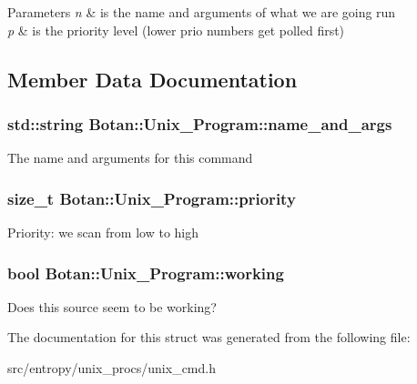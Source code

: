 \begin{DoxyParams}{Parameters}
{\em n} & is the name and arguments of what we are going run \\
\hline
{\em p} & is the priority level (lower prio numbers get polled first) \\
\hline
\end{DoxyParams}


\subsection{Member Data Documentation}
\hypertarget{structBotan_1_1Unix__Program_acc1dab9a97f04638521b35b57b32245c}{
\subsubsection[{name\-\_\-and\-\_\-args}]{\setlength{\rightskip}{0pt plus 5cm}std\-::string Botan\-::\-Unix\-\_\-\-Program\-::name\-\_\-and\-\_\-args}}\label{structBotan_1_1Unix__Program_acc1dab9a97f04638521b35b57b32245c}
The name and arguments for this command \hypertarget{structBotan_1_1Unix__Program_adcc0fcf2eea7ac2c93bc279cd584030e}{
\subsubsection[{priority}]{\setlength{\rightskip}{0pt plus 5cm}size\-\_\-t Botan\-::\-Unix\-\_\-\-Program\-::priority}}\label{structBotan_1_1Unix__Program_adcc0fcf2eea7ac2c93bc279cd584030e}
Priority\-: we scan from low to high \hypertarget{structBotan_1_1Unix__Program_a185cfe977674fbd20714aff5dd78b0bc}{
\subsubsection[{working}]{\setlength{\rightskip}{0pt plus 5cm}bool Botan\-::\-Unix\-\_\-\-Program\-::working}}\label{structBotan_1_1Unix__Program_a185cfe977674fbd20714aff5dd78b0bc}
Does this source seem to be working? 

The documentation for this struct was generated from the following file\-:\begin{DoxyCompactItemize}
\item 
src/entropy/unix\-\_\-procs/unix\-\_\-cmd.\-h\end{DoxyCompactItemize}

